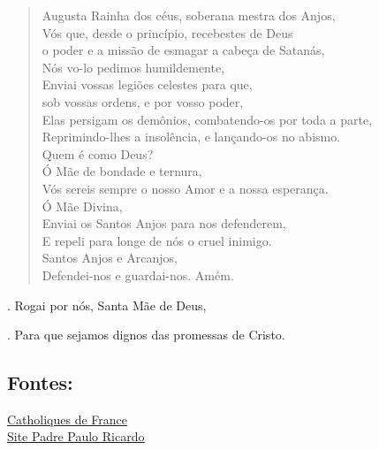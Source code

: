\documentclass[a4paper,14pt]{extarticle} \usepackage[utf8]{inputenc}
\makeatletter
\newcommand{\vers@resp@sym}{%
  \raisebox{0.2ex}{\rotatebox[origin=c]{-20}{$\m@th\rceil$}}%
}
\newcommand{\vers@resp}[2]{%
  {\ooalign{%
     \hidewidth\kern#1\vers@resp@sym\hidewidth\cr
     #2\cr
  }}%
}
\DeclareRobustCommand{\versicle}{\vers@resp{-0.1em}{V}}
\DeclareRobustCommand{\response}{\vers@resp{0pt}{R}}
\makeatother
\begin{document}
\begin{verse}
Augusta Rainha dos céus, soberana mestra dos Anjos,\\
Vós que, desde o princípio, recebestes de Deus\\
o poder e a missão de esmagar a cabeça de Satanás,\\
Nós vo-lo pedimos humildemente,\\
Enviai vossas legiões celestes para que,\\
sob vossas ordens, e por vosso poder,\\
Elas persigam os demônios, combatendo-os por toda a parte,\\
Reprimindo-lhes a insolência, e lançando-os no abismo.\\
Quem é como Deus?\\
Ó Mãe de bondade e ternura,\\
Vós sereis sempre o nosso Amor e a nossa esperança.\\
Ó Mãe Divina,\\
Enviai os Santos Anjos para nos defenderem,\\
E repeli para longe de nós o cruel inimigo.\\
Santos Anjos e Arcanjos,\\
Defendei-nos e guardai-nos. Amém.

\end{verse}

\response. \quad Rogai por nós, Santa Mãe de Deus,

\versicle. \quad Para que sejamos dignos das promessas de Cristo. \\

\vfill

\begin{center}
\subsection*{Fontes:}
\underline{\href{https://catholiquedefrance.fr/histoire-de-la-priere-auguste-reine-des-cieux/}{Catholiques de France}}\\
\underline{\href{https://padrepauloricardo.org/blog/aprenda-a-oracao-augusta-rainha-dos-ceus}{Site Padre Paulo Ricardo}}\\

\end{center}
\end{document}
